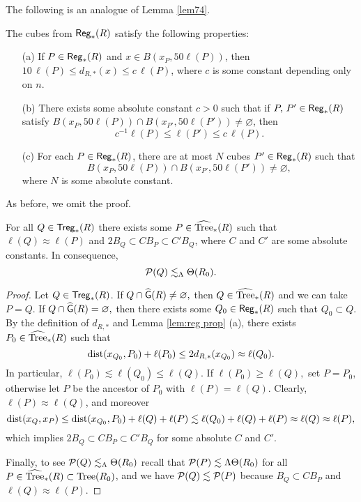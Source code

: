 The following is an analogue of Lemma \ref{lem74}.
\begin{lemma}\label{lem:reg prop}
	The cubes from ${\mathsf{Reg}}_*(R)$ satisfy the following properties:
	\begin{itemize}
		\item[(a)] If $P\in{\mathsf{Reg}}_*(R)$ and $x\in B(x_{P},50\ell(P))$, then $10\,\ell(P)\leq d_{R,*}(x) \leq c\,\ell(P)$,
		where $c$ is some constant depending only on $n$. 
		\item[(b)] There exists some absolute constant $c>0$ such that if $P,\,P'\in{\mathsf{Reg}}_*(R)$ satisfy $B(x_{P},50\ell(P))\cap B(x_{P'},50\ell(P'))
		\neq\varnothing$, then
		$$c^{-1}\ell(P)\leq \ell(P')\leq c\,\ell(P).$$
		\item[(c)] For each $P\in {\mathsf{Reg}}_*(R)$, there are at most $N$ cubes $P'\in{\mathsf{Reg}}_*(R)$ such that
		$$B(x_{P},50\ell(P))\cap B(x_{P'},50\ell(P'))
		\neq\varnothing,$$
		where $N$ is some absolute constant.		
	\end{itemize}
\end{lemma}
As before, we omit the proof.

\begin{lemma}\label{lem:QtregPtree}
	For all $Q\in{\mathsf{Treg}}_*(R)$ there exists some $P\in{\widehat{{\rm Tree}}}_*(R)$ such that $\ell(Q)\approx\ell(P)$ and $2B_Q\subset C B_{P}\subset C' B_{Q}$, where $C$ and $C'$ are some absolute constants. In consequence,
	\begin{equation}\label{eq:treg dens bdd}
	{\mathcal P}(Q)\lesssim_{\Lambda}\Theta(R_0).
	\end{equation}
\end{lemma}
\begin{proof}
	Let $Q\in{\mathsf{Treg}}_*(R)$. If $Q\cap{\widehat{{\mathsf G}}}(R)\neq\varnothing,$ then $Q\in{\widehat{{\rm Tree}}}_*(R)$ and we can take $P=Q$. If $Q\cap{\widehat{{\mathsf G}}}(R)=\varnothing,$ then there exists some $Q_0\in{\mathsf{Reg}}_*(R)$ such that $Q_0\subset Q$. By the definition of $d_{R,*}$ and Lemma \ref{lem:reg prop} (a), there exists $P_0\in{\widehat{{\rm Tree}}}_*(R)$ such that
	\begin{equation*}
	{\rm dist}(x_{Q_0},P_0)+\ell(P_0)\le 2 d_{R,*}(x_{Q_0})\approx \ell(Q_0).
	\end{equation*}
	In particular, $\ell(P_0)\lesssim \ell(Q_0)\le\ell(Q)$. If $\ell(P_0)\ge\ell(Q),$ set $P=P_0$, otherwise let $P$ be the ancestor of $P_0$ with $\ell(P)= \ell(Q)$. Clearly, $\ell(P)\approx\ell(Q)$, and moreover
	\begin{equation*}
	{\rm dist}(x_Q,x_P)\le {\rm dist}(x_{Q_0},P_0)+\ell(Q)+\ell(P)\lesssim\ell(Q_0)+\ell(Q)+\ell(P)\approx \ell(Q)\approx\ell(P),
	\end{equation*}
	which implies $2B_Q\subset C B_{P}\subset C' B_{Q}$ for some absolute $C$ and $C'$.
	
	Finally, to see ${\mathcal P}(Q)\lesssim_{\Lambda}\Theta(R_0)$ recall that ${\mathcal P}(P)\lesssim \Lambda\Theta(R_0)$ for all $P\in{\widehat{{\rm Tree}}}_*(R)\subset{\rm Tree}(R_0)$, and we have ${\mathcal P}(Q)\lesssim{\mathcal P}(P)$ because $B_Q\subset C B_P$ and $\ell(Q)\approx \ell(P)$.
\end{proof}

